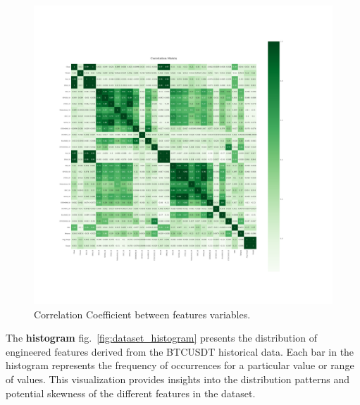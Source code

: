 \begin{figure}[h]
\centering
\begin{adjustbox}{max width=1.2\textwidth,center}
    \includegraphics[scale=1.2, trim={30mm 70mm 50mm 110mm}, clip]{./pdf/correlation_matrix.pdf}
\end{adjustbox}
\caption{Correlation Coefficient between features variables.}
\label{fig:corr_coef}
\end{figure}

The \textbf{histogram} fig.~\ref{fig:dataset_histogram} presents the distribution of engineered features derived from the BTCUSDT historical data.
Each bar in the histogram represents the frequency of occurrences for a particular value or range of values.
This visualization provides insights into the distribution patterns and potential skewness of the different features in the dataset.


